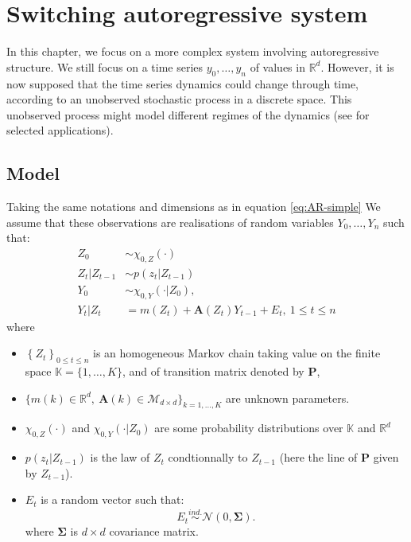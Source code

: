 \documentclass[]{book}
\providecommand{\tightlist}{%
  \setlength{\itemsep}{0pt}\setlength{\parskip}{0pt}}
\begin{document}
\hypertarget{switching-autoregressive-system}{%
\chapter{Switching autoregressive system}\label{switching-autoregressive-system}}

In this chapter, we focus on a more complex system involving autoregressive structure. We still focus on a time series \(y_0, \dots, y_n\) of values in \(\mathbb{R}^d\). However, it is now supposed that the time series dynamics could change through time, according to an unobserved stochastic process in a discrete space.
This unobserved process might model different regimes of the dynamics (see \citet{rabiner1989tutorial} for selected applications).

\hypertarget{model-1}{%
\section{Model}\label{model-1}}

Taking the same notations and dimensions as in equation \eqref{eq:AR-simple}
We assume that these observations are realisations of random variables \(Y_0,\dots, Y_n\) such that:
\begin{align*}
Z_0 &\sim \chi_{0, Z}(\cdot)\\
Z_t \vert Z_{t - 1} &\sim p(z_t \vert Z_{t - 1}) \\
Y_0 &\sim \chi_{0, Y}(\cdot \vert Z_0), \\
Y_t \vert Z_t &= m(Z_t) + \mathbf{A}(Z_t)Y_{t -1} + E_t,~1\leq t \leq n 
\end{align*}
where

\begin{itemize}
\tightlist
\item
  \(\left\lbrace Z_t \right\rbrace_{0\leq t \leq n}\) is an homogeneous Markov chain taking value on the finite space \(\mathbb{K} = \lbrace1,\dots, K \rbrace\), and of transition matrix denoted by \(\mathbf{P}\),
\item
  \(\lbrace m(k)\in\mathbb{R}^d,~\mathbf{A}(k)\in \mathcal{M}_{d\times d}\rbrace_{k = 1,\dots, K}\) are unknown parameters.
\item
  \(\chi_{0, Z}(\cdot)\) and \(\chi_{0, Y}(\cdot \vert Z_0)\) are some probability distributions over \(\mathbb{K}\) and \(\mathbb{R}^d\)
\item
  \(p(z_t\vert Z_{t-1})\) is the law of \(Z_t\) condtionnally to \(Z_{t - 1}\) (here the line of \(\mathbf{P}\) given by \(Z_{t - 1}\)).
\item
  \(E_t\) is a random vector such that:
  \begin{equation*}
  E_t \overset{ind.}{\sim} \mathcal{N}\left(0, \mathbf{\Sigma}\right).
  \end{equation*} where \(\mathbf{\Sigma}\) is \(d\times d\) covariance matrix.
\end{itemize}
\end{document}
